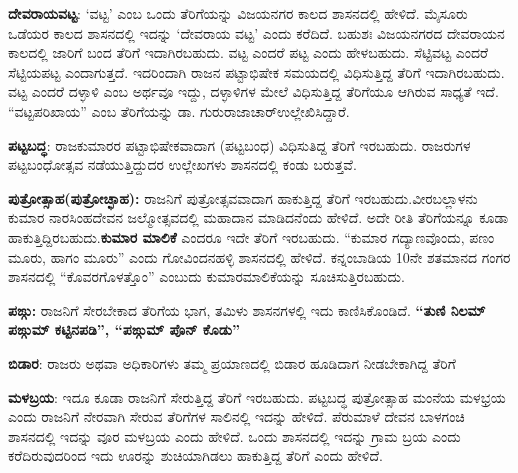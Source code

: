 \textbf{ದೇವರಾಯವಟ್ಟ}: ‘ವಟ್ಟ’ ಎಂಬ ಒಂದು ತೆರಿಗೆಯನ್ನು ವಿಜಯನಗರ ಕಾಲದ ಶಾಸನದಲ್ಲಿ ಹೇಳಿದೆ. ಮೈಸೂರು ಒಡೆಯರ ಕಾಲದ ಶಾಸನದಲ್ಲಿ ಇದನ್ನು ‘ದೇವರಾಯ ವಟ್ಟ’ ಎಂದು ಕರೆದಿದೆ. ಬಹುಶಃ ವಿಜಯನಗರದ ದೇವರಾಯನ ಕಾಲದಲ್ಲಿ ಜಾರಿಗೆ ಬಂದ ತೆರಿಗೆ ಇದಾಗಿರಬಹುದು. ವಟ್ಟ ಎಂದರೆ ಪಟ್ಟ ಎಂದು ಹೇಳಬಹುದು. ಸೆಟ್ಟಿವಟ್ಟ ಎಂದರೆ ಸೆಟ್ಟಿಯಪಟ್ಟ ಎಂದಾಗುತ್ತದೆ. ಇದರಿಂದಾಗಿ ರಾಜನ ಪಟ್ಟಾಭಿಷೇಕ ಸಮಯದಲ್ಲಿ ವಿಧಿಸುತ್ತಿದ್ದ ತೆರಿಗೆ ಇದಾಗಿರಬಹುದು. ವಟ್ಟ ಎಂದರೆ ದಳ್ಳಾಳಿ ಎಂಬ ಅರ್ಥವೂ ಇದ್ದು, ದಳ್ಳಾಳಿಗಳ ಮೇಲೆ ವಿಧಿಸುತ್ತಿದ್ದ ತೆರಿಗೆಯೂ ಆಗಿರುವ ಸಾಧ್ಯತೆ ಇದೆ. “ವಟ್ಟಪರಿಖಾಯ” ಎಂಬ ತೆರಿಗೆಯನ್ನು ಡಾ. ಗುರುರಾಜಾಚಾರ್​ ಉಲ್ಲೇಖಿಸಿದ್ದಾರೆ.

\textbf{ಪಟ್ಟಬದ್ಧ}: ರಾಜಕುಮಾರರ ಪಟ್ಟಾಭಿಷೇಕವಾದಾಗ (ಪಟ್ಟಬಂಧ) ವಿಧಿಸುತಿದ್ದ ತೆರಿಗೆ ಇರಬಹುದು. ರಾಜರುಗಳ ಪಟ್ಟಬಂಧೋತ್ಸವ ನಡೆಯುತ್ತಿದ್ದುದರ ಉಲ್ಲೇಖಗಳು ಶಾಸನದಲ್ಲಿ ಕಂಡು ಬರುತ್ತವೆ.

\textbf{ಪುತ್ರೋತ್ಸಾಹ}\textbf{(ಪುತ್ರೋಚ್ಛಾಹ):} ರಾಜನಿಗೆ ಪುತ್ರೋತ್ಸವವಾದಾಗ ಹಾಕುತ್ತಿದ್ದ ತೆರಿಗೆ ಇರಬಹುದು.\break ವೀರಬಲ್ಲಾಳನು ಕುಮಾರ ನಾರಸಿಂಹದೇವನ ಜಲ್ಮೋತ್ಸವದಲ್ಲಿ ಮಹಾದಾನ ಮಾಡಿದನೆಂದು ಹೇಳಿದೆ. ಅದೇ ರೀತಿ ತೆರಿಗೆಯನ್ನೂ ಕೂಡಾ ಹಾಕುತ್ತಿದ್ದಿರಬಹುದು.\textbf{ಕುಮಾರ ಮಾಲಿಕೆ} ಎಂದರೂ ಇದೇ ತೆರಿಗೆ ಇರಬಹುದು. “ಕುಮಾರ ಗದ್ಯಾಣವೊಂದು, ಪಣಂ ಮೂರು, ಹಾಗಂ ಮೂರು” ಎಂದು ಗೋವಿಂದನಹಳ್ಳಿ ಶಾಸನದಲ್ಲಿ ಹೇಳಿದೆ. ಕನ್ನಂಬಾಡಿಯ 10ನೇ ಶತಮಾನದ ಗಂಗರ ಶಾಸನದಲ್ಲಿ “ಕೊವರಗೊಳತ್ತೊಂ” ಎಂಬುದು ಕುಮಾರಮಾಲಿಕೆಯನ್ನು ಸೂಚಿಸುತ್ತಿರಬಹುದು.

\textbf{ಪಙ್ಗು:} ರಾಜನಿಗೆ ಸೇರಬೇಕಾದ ತೆರಿಗೆಯ ಭಾಗ, ತಮಿಳು ಶಾಸನಗಳಲ್ಲಿ ಇದು ಕಾಣಿಸಿಕೊಂಡಿದೆ. \textbf{“ತುಣಿ ನಿಲಮ್ ಪಙ್ಗುಮ್ ಕಟ್ಟಿನಪಡಿ”, “ಪಙ್ಗುಮ್ ಪೊನ್​ ಕೊಡು”}

\textbf{ಬಿಡಾರ}: ರಾಜರು ಅಥವಾ ಅಧಿಕಾರಿಗಳು ತಮ್ಮ ಪ್ರಯಾಣದಲ್ಲಿ ಬಿಡಾರ ಹೂಡಿದಾಗ ನೀಡಬೇಕಾಗಿದ್ದ ತೆರಿಗೆ 

\textbf{ಮಳಬ್ರಯ}: ಇದೂ ಕೂಡಾ ರಾಜನಿಗೆ ಸೇರುತ್ತಿದ್ದ ತೆರಿಗೆ ಇರಬಹುದು. ಪಟ್ಟಬದ್ಧ ಪುತ್ರೋತ್ಸಾಹ ಮಂನೆಯ ಮಳಭ್ರಯ ಎಂದು ರಾಜನಿಗೆ ನೇರವಾಗಿ ಸೇರುವ ತೆರಿಗೆಗಳ ಸಾಲಿನಲ್ಲಿ ಇದನ್ನು ಹೇಳಿದೆ. ಪೆರುಮಾಳೆ ದೇವನ ಬಾಳಗಂಚಿ ಶಾಸನದಲ್ಲಿ ಇದನ್ನು ವೂರ ಮಳಬ್ರಯ ಎಂದು ಹೇಳಿದೆ. ಒಂದು ಶಾಸನದಲ್ಲಿ ಇದನ್ನು ಗ್ರಾಮ ಬ್ರಯ ಎಂದು ಕರೆದಿರುವುದರಿಂದ ಇದು ಊರನ್ನು ಶುಚಿಯಾಗಿಡಲು ಹಾಕುತ್ತಿದ್ದ ತೆರಿಗೆ ಎಂದು ಹೇಳಿದೆ.

